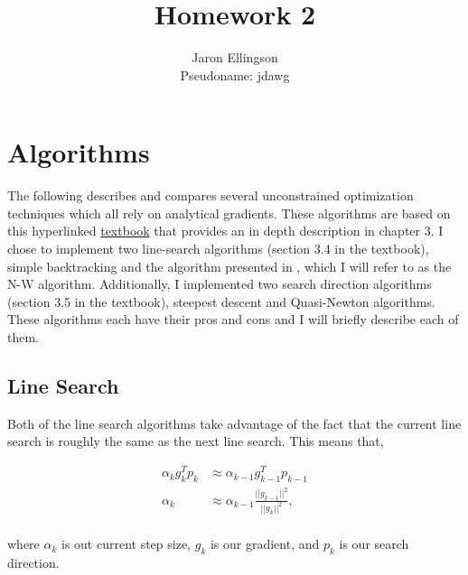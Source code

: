 \documentclass{article}
\begin{document}
\title{Homework 2}
\author{Jaron Ellingson\\
Pseudoname: jdawg}
\maketitle


\section*{Algorithms}

The following describes and compares several unconstrained optimization techniques which all rely on analytical gradients. These algorithms are based on this hyperlinked \href{https://byu.box.com/shared/static/17bqmaop0v1o0fwqg1etx7dofl6ad35t.pdf}{textbook} that provides an in depth description in chapter 3. I chose to implement two line-search algorithms (section 3.4 in the textbook), simple backtracking and the algorithm presented in \cite{nocedal2006numerical}, which I will refer to as the N-W algorithm. Additionally, I implemented two search direction algorithms (section 3.5 in the textbook), steepest descent and Quasi-Newton algorithms. These algorithms each have their pros and cons and I will briefly describe each of them.

\subsection*{Line Search}

Both of the line search algorithms take advantage of the fact that the current line search is roughly the same as the next line search. This means that, 

\begin{equation*}
\begin{aligned}
\alpha_k g_k^T p_k  & \approx \alpha_{k-1} g_{k-1}^T p_{k-1} \\
\alpha_k & \approx \alpha_{k-1} \frac{||g_{k-1}||^2}{||g_{k}||^2}, \\
\end{aligned}
\end{equation*}

where $\alpha_k$ is out current step size, $g_k$ is our gradient, and $p_k$ is our search direction.
\end{document}
